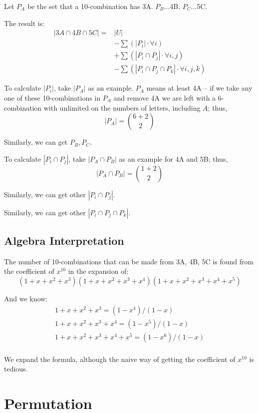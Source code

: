 Let $P_A$ be the set that a 10-combination has  3A. $P_B$...4B. $P_C$...5C. 

The result is:
\begin{align*}
|3A \cap 4B \cap 5C| = & |U|\\
& - \sum{(|P_i|\cdot \forall i)} \\
& + \sum{(|P_i \cap P_j|\cdot \forall i,j)}\\
& - \sum{(|P_i \cap P_j \cap P_k|\cdot \forall i,j,k)}
\end{align*}

To calculate $|P_i|$, take $|P_A|$ as an example. $P_A$ means at least 4A -- if we take any one of these 10-combinations in $P_A$ and remove 4A we are left with a 6-combination with unlimited on the numbers of letters, including $A$; thus,
$$
|P_A|={6+2 \choose 2}
$$

Similarly, we can get $P_B, P_C$.

To calculate $|P_i \cap P_j|$, take $|P_A \cap P_B|$ as an example for 4A and 5B; thus,
$$
|P_A \cap P_B| = {1+2 \choose 2}
$$

Similarly, we can get other $|P_i \cap P_j|$.

Similarly, we can get other $|P_i \cap P_j \cap P_k|$.
\subsection{Algebra Interpretation}
The number of 10-combinations that can be made from 3A, 4B, 5C is found from the coefficient of $x^{10}$ in the expansion of:
$$
(1+x+x^2+x^3)(1+x+x^2+x^3+x^4)(1+x+x^2+x^3+x^4+x^5)
$$

And we know:
\begin{eqnarray*}
1+x+x^2+x^3         = (1-x^4)/(1-x)  \\
1+x+x^2+x^3+x^4     = (1-x^5)/(1-x)  \\
1+x+x^2+x^3+x^4+x^5 = (1-x^6)/(1-x)  \\
\end{eqnarray*}


We expand the formula, although the  naive way of getting the coefficient of $x^{10}$ is tedious. 

\section{Permutation}


